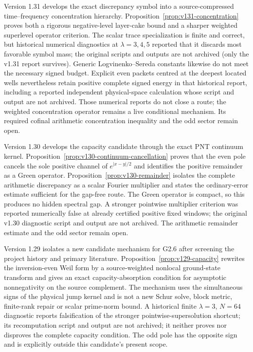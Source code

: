 \documentclass[11pt]{article}
\theoremstyle{remark}
\begin{document}
Version 1.31 develops the exact discrepancy symbol into a
source-compressed time--frequency concentration hierarchy.
Proposition~\ref{prop:v131-concentration} proves both a rigorous
negative-level layer-cake bound and a sharper weighted superlevel
operator criterion. The scalar trace specialization is finite and
correct, but historical numerical diagnostics at $\lambda=3,4,5$
reported that it discards most favorable symbol mass; the original
scripts and outputs are not archived (only the v1.31 report survives). Generic Logvinenko--Sereda
constants likewise do not meet the necessary signed budget. Explicit
even packets centred at the deepest located wells nevertheless retain
positive complete signed energy in that historical report, including
a reported independent physical-space calculation whose script and
output are not archived. Those numerical reports do not close a route; the
weighted concentration operator remains a live conditional mechanism.
Its required cofinal arithmetic concentration inequality and the odd
sector remain open.

Version 1.30 develops the capacity candidate through the exact PNT
continuum kernel. Proposition~\ref{prop:v130-continuum-cancellation}
proves that the even pole cancels the sole positive channel of
$e^{|x-y|/2}$ and identifies the positive remainder as a Green
operator. Proposition~\ref{prop:v130-remainder} isolates the complete
arithmetic discrepancy as a scalar Fourier multiplier and states the
ordinary-error estimate sufficient for the gap-free route. The Green
operator is compact, so this produces no hidden spectral gap. A
stronger pointwise multiplier criterion was reported numerically false
at already certified positive fixed windows; the original v1.30
diagnostic script and output are not archived.
The arithmetic remainder estimate and the odd sector remain open.

Version 1.29 isolates a new candidate mechanism for G2.6 after screening
the project history and primary literature. Proposition~\ref{prop:v129-capacity}
rewrites the inversion-even Weil form by a source-weighted nonlocal
ground-state transform and gives an exact capacity-absorption condition
for asymptotic nonnegativity on the source complement.  The mechanism
uses the simultaneous signs of the physical jump kernel and is not a
new Schur solve, block metric, finite-rank repair or scalar prime-norm
bound. A historical finite $\lambda=3$, $N=64$ diagnostic reports
falsification of the stronger pointwise-supersolution shortcut; its
recomputation script and output are not archived; it neither proves nor disproves the
complete capacity condition.  The odd pole has the opposite sign and
is explicitly outside this candidate's present scope.
\end{document}

